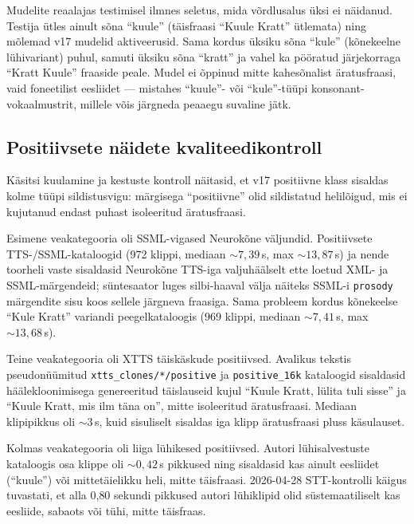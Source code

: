 Mudelite reaalajas testimisel ilmnes seletus, mida võrdlusalus üksi ei näidanud. Testija ütles ainult sõna \enquote{kuule} (täisfraasi \enquote{Kuule Kratt} ütlemata) ning mõlemad v17 mudelid aktiveerusid. Sama kordus üksiku sõna \enquote{kule} (kõnekeelne lühivariant) puhul, samuti üksiku sõna \enquote{kratt} ja vahel ka pööratud järjekorraga \enquote{Kratt Kuule} fraaside peale. Mudel ei õppinud mitte kahesõnalist äratusfraasi, vaid foneetilist eesliidet --- mistahes \enquote{kuule}- või \enquote{kule}-tüüpi konsonant-vokaalmustrit, millele võis järgneda peaaegu suvaline jätk.

\subsection{Positiivsete näidete kvaliteedikontroll}
\label{sec:positive-quality-control}

Käsitsi kuulamine ja kestuste kontroll näitasid, et v17 positiivne klass sisaldas kolme tüüpi sildistusvigu: märgisega \enquote{positiivne} olid sildistatud helilõigud, mis ei kujutanud endast puhast isoleeritud äratusfraasi.

Esimene veakategooria oli SSML-vigased Neurokõne väljundid. Positiivsete TTS-/SSML-kataloogid (972 klippi, mediaan ${\sim}7{,}39$\,s, max ${\sim}13{,}87$\,s) ja nende toorheli vaste sisaldasid Neurokõne TTS-iga valju\-häälselt ette loetud XML- ja SSML-märgendeid; süntesaator luges silbi-haaval välja näiteks SSML-i \texttt{prosody} märgendite sisu koos sellele järgneva fraasiga. Sama probleem kordus kõnekeelse \enquote{Kule Kratt} variandi peegel\-kataloogis (969 klippi, mediaan ${\sim}7{,}41$\,s, max ${\sim}13{,}68$\,s).

Teine veakategooria oli XTTS täiskäskude positiivsed. Avalikus tekstis pseudonüümitud \texttt{xtts\_clones/*/positive} ja \texttt{positive\_16k} kataloogid sisaldasid häälekloonimisega genereeritud täislauseid kujul \enquote{Kuule Kratt, lülita tuli sisse} ja \enquote{Kuule Kratt, mis ilm täna on}, mitte isoleeritud äratusfraasi. Mediaan klipipikkus oli ${\sim}3$\,s, kuid sisuliselt sisaldas iga klipp äratusfraasi pluss käsulauset.

Kolmas veakategooria oli liiga lühikesed positiivsed. Autori lühisalvestuste kataloogis osa klippe oli ${\sim}0{,}42$\,s pikkused ning sisaldasid kas ainult eesliidet (\enquote{kuule}) või mittetäielikku heli, mitte täisfraasi. 2026-04-28 STT-kontrolli käigus tuvastati, et alla 0{,}80 sekundi pikkused autori lühiklipid olid süstemaatiliselt kas eesliide, sabaots või tühi, mitte täisfraas.

